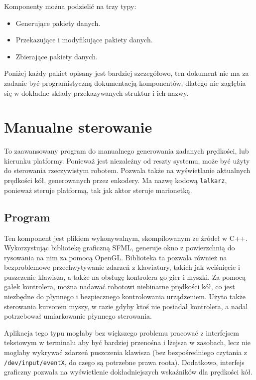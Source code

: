 	Komponenty można podzielić na trzy typy:
	\begin{itemize}
		\item Generujące pakiety danych.
		\item Przekazujące i modyfikujące pakiety danych.
		\item Zbierające pakiety danych.
	\end{itemize}
	Poniżej każdy pakiet opisany jest bardziej szczegółowo, ten dokument nie ma za zadanie być programistyczną dokumentacją komponentów, dlatego 
	nie zagłębia się w dokładne składy przekazywanych struktur i ich nazwy.
	
	\section{Manualne sterowanie}
		To zaawansowany program do manualnego generowania zadanych prędkości, lub kierunku platformy.
		Ponieważ jest niezależny od reszty systemu, może być użyty do sterowania rzeczywistym robotem.
		Pozwala także na wyświetlanie aktualnych prędkości kół, generowanych przez enkodery.
		Ma nazwę kodową \texttt{lalkarz}, ponieważ steruje platformą, tak jak aktor steruje marionetką.
		
		\subsection{Program}
			Ten komponent jest plikiem wykonywalnym, skompilowanym ze źródeł w C++.
			Wykorzystując bibliotekę graficzną SFML, generuje okno z powierzchnią do rysowania na nim za pomocą OpenGL.
			Biblioteka ta pozwala również na bezproblemowe przechwytywanie zdarzeń z klawiatury, takich jak wciśnięcie i puszczenie klawisza, a także na obsługę kontrolera go gier i myszki.
			Za pomocą gałek kontrolera, można nadawać robotowi niebinarne prędkości kół, co jest niezbędne do płynnego i bezpiecznego kontrolowania urządzeniem.
			Użyto także sterowania kursorem myszy, w razie gdyby ktoś nie posiadał kontrolera, a nadal potrzebował umiarkowanie płynnego sterowania.
			
			Aplikacja tego typu mogłaby bez większego problemu pracować z interfejsem tekstowym w terminalu aby być bardziej przenośna i lżejsza w zasobach, 
			lecz nie mogłaby wykrywać zdarzeń puszczenia klawisza
			(bez bezpośredniego czytania z \texttt{/dev/input/eventX}, do czego są potrzebne prawa roota). 
			Dodatkowo, interfejs graficzny pozwala na wyświetlenie dokładniejszych wskaźników dla prędkości kół.
			

